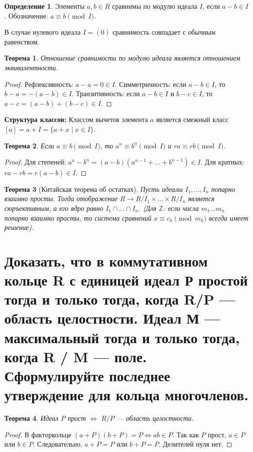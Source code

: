 \documentclass[12pt, a4paper]{article}
\theoremstyle{definition}
\newtheorem{definition}{Определение}[section]
\theoremstyle{plain}
\newtheorem{theorem}{Теорема}[section]
\begin{document}
	\begin{definition}
		Элементы $a, b \in R$ сравнимы по модулю идеала $I$, если $a-b \in I$. Обозначение: $a \equiv b \pmod I$.
	\end{definition}
	В случае нулевого идеала $I=(0)$ сравнимость совпадает с обычным равенством.
	
	\begin{theorem}
		Отношение сравнимости по модулю идеала является отношением эквивалентности.
	\end{theorem}
	\begin{proof}
		Рефлексивность: $a-a=0 \in I$. Симметричность: если $a-b \in I$, то $b-a = -(a-b) \in I$. Транзитивность: если $a-b \in I$ и $b-c \in I$, то $a-c = (a-b)+(b-c) \in I$.
	\end{proof}
	
	\textbf{Структура классов:} Классом вычетов элемента $a$ является смежный класс $[a] = a+I = \{a+x \mid x \in I\}$.
	
	\begin{theorem}
		Если $a \equiv b \pmod I$, то $a^n \equiv b^n \pmod I$ и $ra \equiv rb \pmod I$.
	\end{theorem}
	\begin{proof}
		Для степеней: $a^n - b^n = (a-b)(a^{n-1} + \dots + b^{n-1}) \in I$. Для кратных: $ra - rb = r(a-b) \in I$.
	\end{proof}
	
	\begin{theorem}[Китайская теорема об остатках]
		Пусть идеалы $I_1, \dots, I_n$ попарно взаимно просты. Тогда отображение $R \to R/I_1 \times \dots \times R/I_n$ является сюръективным, а его ядро равно $I_1 \cap \dots \cap I_n$. (Для $\mathbb{Z}$: если числа $m_1 \dots m_n$ попарно взаимно просты, то система сравнений $x \equiv c_k \pmod{m_k}$ всегда имеет решение).
	\end{theorem}
	
	\newpage
	\section{Доказать, что в коммутативном кольце R с единицей идеал Р простой тогда и только тогда, когда R/P --- область целостности. Идеал М --- максимальный тогда и только тогда, когда R / M --- поле. Сформулируйте последнее утверждение для кольца многочленов.}
	
	\begin{theorem}
		Идеал $P$ прост $\iff$ $R/P$ — область целостности.
	\end{theorem}
	\begin{proof}
		В факторкольце $(a+P)(b+P) = P \iff ab \in P$. Так как $P$ прост, $a \in P$ или $b \in P$. Следовательно, $a+P=P$ или $b+P=P$. Делителей нуля нет.
	\end{proof}
	
\end{document}
